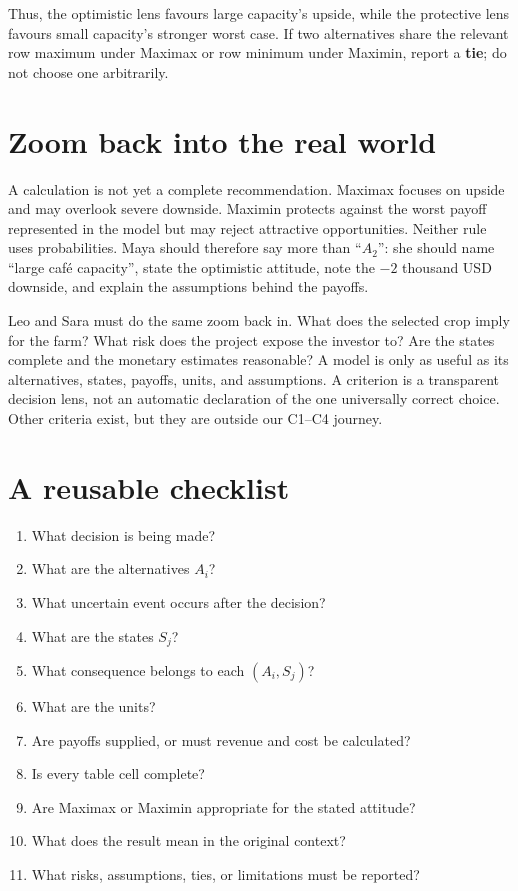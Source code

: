 	Thus, the optimistic lens favours large capacity's upside, while the protective
	lens favours small capacity's stronger worst case. If two alternatives share
	the relevant row maximum under Maximax or row minimum under Maximin, report a
	\textbf{tie}; do not choose one arbitrarily.
	
	\section{Zoom back into the real world}
	
	A calculation is not yet a complete recommendation. Maximax focuses on upside
	and may overlook severe downside. Maximin protects against the worst payoff
	represented in the model but may reject attractive opportunities. Neither rule
	uses probabilities. Maya should therefore say more than ``\(A_2\)'': she
	should name ``large café capacity'', state the optimistic attitude, note the
	\(-2\) thousand USD downside, and explain the assumptions behind the payoffs.
	
	Leo and Sara must do the same zoom back in. What does the selected crop imply
	for the farm? What risk does the project expose the investor to? Are the states
	complete and the monetary estimates reasonable? A model is only as useful as
	its alternatives, states, payoffs, units, and assumptions. A criterion is a
	transparent decision lens, not an automatic declaration of the one universally
	correct choice. Other criteria exist, but they are outside our C1--C4 journey.
	
	\section{A reusable checklist}
	\begin{enumerate}[label=\textbf{\arabic*.},leftmargin=2em]
		\item What decision is being made?
		\item What are the alternatives \(A_i\)?
		\item What uncertain event occurs after the decision?
		\item What are the states \(S_j\)?
		\item What consequence belongs to each \((A_i,S_j)\)?
		\item What are the units?
		\item Are payoffs supplied, or must revenue and cost be calculated?
		\item Is every table cell complete?
		\item Are Maximax or Maximin appropriate for the stated attitude?
		\item What does the result mean in the original context?
		\item What risks, assumptions, ties, or limitations must be reported?
	\end{enumerate}
	
